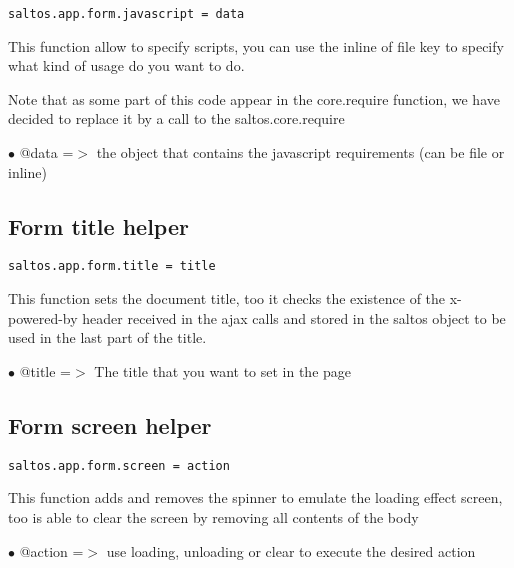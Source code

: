 \documentclass[a4paper]{book}
\begin{document}
\begin{lstlisting}
saltos.app.form.javascript = data
\end{lstlisting}

This function allow to specify scripts, you can use the inline of file key to specify
what kind of usage do you want to do.

Note that as some part of this code appear in the core.require function, we have decided
to replace it by a call to the saltos.core.require

\begin{compactitem}
\item[\color{myblue}$\bullet$] @data =$>$ the object that contains the javascript requirements (can be file or inline)
\end{compactitem}

\hypertarget{toc412}{}
\subsection{Form title helper}

\begin{lstlisting}
saltos.app.form.title = title
\end{lstlisting}

This function sets the document title, too it checks the existence of the x-powered-by
header received in the ajax calls and stored in the saltos object to be used in the
last part of the title.

\begin{compactitem}
\item[\color{myblue}$\bullet$] @title =$>$ The title that you want to set in the page
\end{compactitem}

\hypertarget{toc413}{}
\subsection{Form screen helper}

\begin{lstlisting}
saltos.app.form.screen = action
\end{lstlisting}

This function adds and removes the spinner to emulate the loading effect screen, too is able
to clear the screen by removing all contents of the body

\begin{compactitem}
\item[\color{myblue}$\bullet$] @action =$>$ use loading, unloading or clear to execute the desired action
\end{compactitem}
\end{document}
